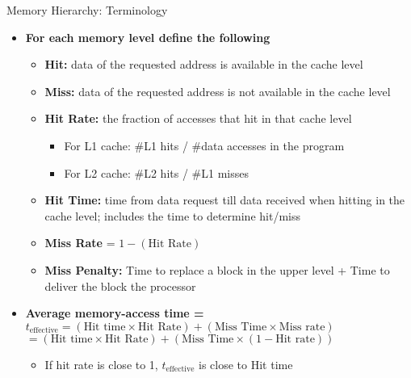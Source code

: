 \documentclass[aspectratio=169,12pt]{beamer}
\begin{document}
\begin{frame}{Memory Hierarchy: Terminology}
\begin{itemize}
  \item \textbf{For each memory level define the following}
  \begin{itemize}
    \item \textcolor{green!60!black}{\textbf{Hit:}} data of the requested address is available in the cache level
    \item \textcolor{green!60!black}{\textbf{Miss:}} data of the requested address is not available in the cache level
    \item \textcolor{green!60!black}{\textbf{Hit Rate:}} the fraction of accesses that hit in that cache level
    \begin{itemize}
      \item For L1 cache: \#L1 hits / \#data accesses in the program
      \item For L2 cache: \#L2 hits / \#L1 misses
    \end{itemize}
    \item \textcolor{green!60!black}{\textbf{Hit Time:}} time from data request till data received when hitting in the cache level; includes the time to determine hit/miss
    \item \textcolor{green!60!black}{\textbf{Miss Rate}} = $1 - (\text{Hit Rate})$
    \item \textcolor{green!60!black}{\textbf{Miss Penalty:}} Time to replace a block in the upper level + Time to deliver the block the processor
  \end{itemize}
  
  \vspace{0.3cm}
  
  \item \textbf{Average memory-access time =}\\
  \hspace{1cm} $t_{\text{effective}} = (\text{Hit time} \times \text{Hit Rate}) + (\text{Miss Time} \times \text{Miss rate})$\\
  \hspace{2.2cm} $= (\text{Hit time} \times \text{Hit Rate}) + (\text{Miss Time} \times (1-\text{Hit rate}))$
  \begin{itemize}
    \item If hit rate is close to 1, $t_{\text{effective}}$ is close to Hit time
  \end{itemize}
\end{itemize}
\end{frame}
\end{document}
